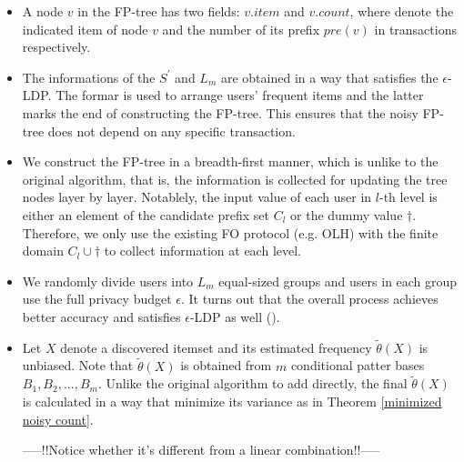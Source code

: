 \documentclass[conference]{IEEEtran}
\begin{document}
\begin{itemize}
\item A node $v$ in the FP-tree has two fields: $v.item$ and $v.count$, where denote the indicated item of node $v$ and the number of its prefix $pre(v)$ in transactions respectively.
\item The informations of the $S^{\prime}$ and $L_m$ are obtained in a way that satisfies the $\epsilon$-LDP. The formar is used to arrange users' frequent items and the latter marks the end of constructing the FP-tree. This ensures that the noisy FP-tree does not depend on any specific transaction.
\item We construct the FP-tree in a breadth-first manner, which is unlike to the original algorithm, that is, the information is collected for updating the tree nodes layer by layer. Notablely, the input value of each user in $l$-th level is either an element of the candidate prefix set $C_l$ or the dummy value $\dagger$. Therefore, we only use the existing FO protocol (e.g. OLH) with the finite domain $C_l \cup \dagger$ to collect information at each level.
\item We randomly divide users into $L_m$ equal-sized groups and users in each group use the full privacy budget $\epsilon$. It turns out that the overall process achieves better accuracy and satisfies $\epsilon$-LDP as well (\cite{a8,privtrie}).
\item {\color{red} Let $X$ denote a discovered itemset and its estimated frequency $\tilde {\theta}(X)$ is unbiased. Note that $\tilde {\theta}(X)$ is obtained from $m$ conditional patter bases $B_1,B_2,...,B_m$. Unlike the original algorithm to add directly, the final $\tilde {\theta}(X)$ is calculated in a way that minimize its variance as in Theorem \ref{minimized noisy count}. 






-----!!Notice whether it's different from a linear combination!!-----}

\end{itemize}
\end{document}
